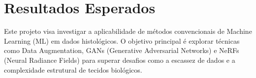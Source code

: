 \section{Resultados Esperados}

Este projeto visa investigar a aplicabilidade de métodos convencionais de Machine Learning (ML) em dados histológicos.  O objetivo principal é explorar técnicas como Data Augmentation, GANs (Generative Adversarial Networks) e NeRFs (Neural Radiance Fields) para superar desafios como a escassez de dados e a complexidade estrutural de tecidos biológicos.
